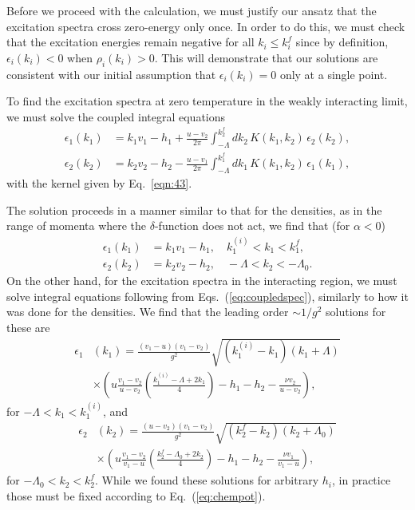 \documentclass[aps,pra,
superscriptaddress,
reprint,twocolumn,preprintnumbers,
amsmath,amssymb,
nofootinbib]{revtex4-1}
\def\rf#1{(\ref{#1})}
\begin{document}
Before we proceed with the calculation, we must justify our ansatz that the excitation spectra cross zero-energy only once. In order to do this, we must check that the excitation energies remain negative for all $k_i \leq k_i^f$ since by definition, $\epsilon_i(k_i) < 0$ when $\rho_i(k_i) > 0$. This will demonstrate that our solutions are consistent with our initial assumption that $\epsilon_i(k_i) = 0$ only at a single point. 

To find the excitation spectra at zero temperature in the weakly interacting limit, we must solve the coupled integral equations
		\begin{align}
		\label{eq:coupledspec}
		\epsilon_1(k_1) & =  k_1 v_1 - h_1 + \frac{u - v_2}{2\pi} \int_{-\Lambda}^{k_2^f} dk_2 \,K(k_1, k_2) \, \epsilon_2( k_2), \nonumber \\
		\epsilon_2(k_2) & =  k_2 v_2 - h_2 - \frac{u - v_1}{2\pi} \int_{-\Lambda}^{k_1^f} d k_1\,K(k_1,k_2) \,  \epsilon_1(k_1),
		\end{align}
with the kernel given by Eq.~\eqref{eqn:43}. 

The solution proceeds in a manner similar to that for the densities, as in the range of momenta where the $\delta$-function does not act, we find that (for $\alpha < 0$) 
		\begin{align}
		\label{epsnonint}
		\epsilon_1(k_1) & = k_1 v_1 - h_1, \quad k_1^{(i)} <k_1 < k_1^f, \nonumber \\
		\epsilon_2(k_2) & = k_2 v_2 - h_2, \quad - \Lambda <k_2 < -\Lambda_0.
		\end{align}
On the other hand, for the excitation spectra in the interacting region, we must solve integral equations following from Eqs.~\rf{eq:coupledspec}, similarly to how it was done for the 
densities. We find that the leading order $\sim 1/g^2$ solutions for these are
        \begin{align}
        \epsilon_{1}&(k_1) = \frac{(v_1 - u)( v_1 - v_2)}{g^2} \sqrt{(k_1^{(i)} - k_1)(k_1 + \Lambda)} \nonumber \\ 
        &\times \left( u \frac{v_1 - v_2}{u - v_2}\left(\frac{k_1^{(i)} - \Lambda + 2 k_1}{4} \right) -h_1 - h_2 - \frac{\nu v_2}{u - v_2}\right),
        \end{align}
for $-\Lambda<k_1<k_1^{(i)}$, and        
        \begin{align}
        \epsilon_{2}&(k_2) = \frac{(u - v_2)( v_1 - v_2)}{g^2} \sqrt{(k_2^f - k_2)(k_2 + \Lambda_0)} \nonumber \\ 
        & \times \left( u \frac{v_1 - v_2}{v_1 - u}\left(\frac{k_2^f - \Lambda_0 + 2 k_2}{4} \right) -h_1 - h_2 - \frac{\nu v_1}{v_1 - u}\right),
        \end{align}
for $-\Lambda_0<k_2<k_2^f$. 
While we found these solutions for arbitrary $h_i$, in practice those must be fixed according to Eq.~\rf{eq:chempot}. 
\end{document}
